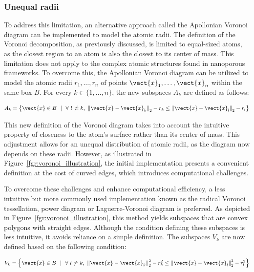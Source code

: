\documentclass[main]{subfiles}
\begin{document}
\subsubsection{Unequal radii}

To address this limitation, an alternative approach called the Apollonian Voronoi diagram can be implemented to model the atomic radii. The definition of the Voronoi decomposition, as previously discussed, is limited to equal-sized atoms, as the closest region to an atom is also the closest to its center of mass. This limitation does not apply to the complex atomic structures found in nanoporous frameworks. To overcome this, the Apollonian Voronoi diagram\autocite{voronoi_apollonian} can be utilized to model the atomic radii $r_1,\ldots,r_n$ of points $\vect{x}_1,\ldots,\vect{x}_n$ within the same box $B$. For every $k\in\{1,\ldots,n\}$, the new subspaces $A_{k}$ are defined as follows:

\begin{equation}\label{eq:r_voronoi_apollonian}
  A_{k} = \left\{\vect{x} \in B\ \ |\ \ \forall\ l\neq k,\ {\lVert \vect{x}-\vect{x}_k \rVert}_2 - r_k \leq {\lVert \vect{x}-\vect{x}_l \rVert}_2 - r_l \right\}
\end{equation}

This new definition of the Voronoi diagram takes into account the intuitive property of closeness to the atom's surface rather than its center of mass. This adjustment allows for an unequal distribution of atomic radii, as the diagram now depends on these radii. However, as illustrated in Figure~\ref{fgr:voronoi_illustration}, the initial implementation presents a convenient definition at the cost of curved edges, which introduces computational challenges.

To overcome these challenges and enhance computational efficiency, a less intuitive but more commonly used implementation known as the radical Voronoi tessellation, power diagram or Laguerre-Voronoi diagram\autocite{aurenhammer_1987} is preferred. As depicted in Figure~\ref{fgr:voronoi_illustration}, this method yields subspaces that are convex polygons with straight edges. Although the condition defining these subspaces is less intuitive, it avoids reliance on a simple definition. The subspaces $V_k$ are now defined based on the following condition:

\begin{equation}\label{eq:r_voronoi_radical}
    V_{k} = \left\{\vect{x} \in B\ \ |\ \ \forall\ l\neq k,\ {\lVert \vect{x}-\vect{x}_k \rVert}_2^2 - r_k^2 \leq {\lVert \vect{x}-\vect{x}_l \rVert}_2^2 - r_l^2 \right\}
  \end{equation}
\end{document}
